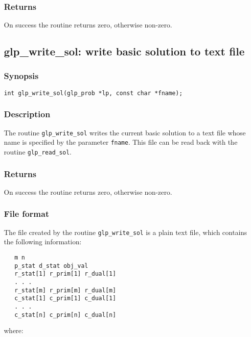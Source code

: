 \subsubsection*{Returns}

On success the routine returns zero, otherwise non-zero.

\newpage

\subsection{glp\_write\_sol: write basic solution to text file}

\subsubsection*{Synopsis}

\begin{verbatim}
int glp_write_sol(glp_prob *lp, const char *fname);
\end{verbatim}

\subsubsection*{Description}

The routine \verb|glp_write_sol| writes the current basic solution to a
text file whose name is specified by the parameter \verb|fname|. This
file can be read back with the routine \verb|glp_read_sol|.

\subsubsection*{Returns}

On success the routine returns zero, otherwise non-zero.

\subsubsection*{File format}

The file created by the routine \verb|glp_write_sol| is a plain text
file, which contains the following information:

\begin{verbatim}
   m n
   p_stat d_stat obj_val
   r_stat[1] r_prim[1] r_dual[1]
   . . .
   r_stat[m] r_prim[m] r_dual[m]
   c_stat[1] c_prim[1] c_dual[1]
   . . .
   c_stat[n] c_prim[n] c_dual[n]
\end{verbatim}

\noindent
where:

